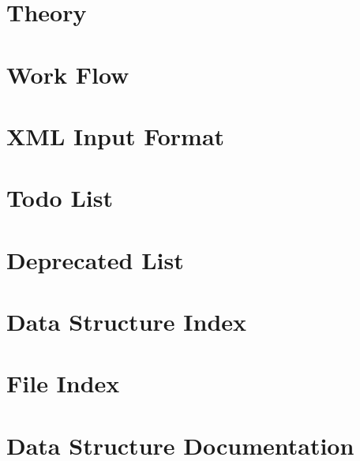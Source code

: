 \documentclass[twoside]{book}
\newcommand{\+}{\discretionary{\mbox{\scriptsize$\hookleftarrow$}}{}{}}
\begin{document}
\chapter{Theory}
\label{theory}

\chapter{Work Flow}
\label{workflow}

\chapter{XML Input Format}
\label{input}

\chapter{Todo List}
\label{todo}

\chapter{Deprecated List}
\label{deprecated}

\chapter{Data Structure Index}

\chapter{File Index}

\chapter{Data Structure Documentation}




















\end{document}
